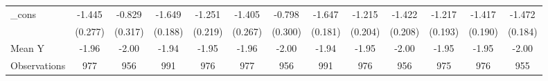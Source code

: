{\begin{tabular}{l*{12}{c}}
\addlinespace
\_cons      &      -1.445\sym{***}&      -0.829\sym{**} &      -1.649\sym{***}&      -1.251\sym{***}&      -1.405\sym{***}&      -0.798\sym{**} &      -1.647\sym{***}&      -1.215\sym{***}&      -1.422\sym{***}&      -1.217\sym{***}&      -1.417\sym{***}&      -1.472\sym{***}\\
            &     (0.277)         &     (0.317)         &     (0.188)         &     (0.219)         &     (0.267)         &     (0.300)         &     (0.181)         &     (0.204)         &     (0.208)         &     (0.193)         &     (0.190)         &     (0.184)         \\
\midrule
Mean Y      &       -1.96         &       -2.00         &       -1.94         &       -1.95         &       -1.96         &       -2.00         &       -1.94         &       -1.95         &       -2.00         &       -1.95         &       -1.95         &       -2.00         \\
Observations&         977         &         956         &         991         &         976         &         977         &         956         &         991         &         976         &         956         &         975         &         976         &         955         \\
\bottomrule
\end{tabular}
}
